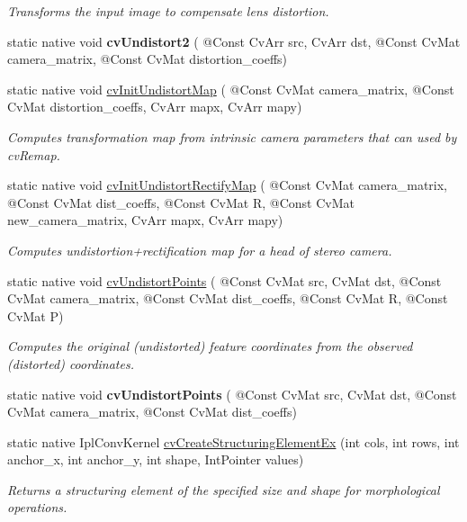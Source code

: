 \begin{DoxyCompactItemize}
\begin{DoxyCompactList}\small\item\em Transforms the input image to compensate lens distortion. \end{DoxyCompactList}\item 
static native void {\bfseries cv\+Undistort2} ( @Const Cv\+Arr src, Cv\+Arr dst, @Const Cv\+Mat camera\+\_\+matrix, @Const Cv\+Mat distortion\+\_\+coeffs)
\item 
static native void \hyperlink{group__imgproc__c_gabf5495653e45cb87934afd107d253eba}{cv\+Init\+Undistort\+Map} ( @Const Cv\+Mat camera\+\_\+matrix, @Const Cv\+Mat distortion\+\_\+coeffs, Cv\+Arr mapx, Cv\+Arr mapy)
\begin{DoxyCompactList}\small\item\em Computes transformation map from intrinsic camera parameters that can used by cv\+Remap. \end{DoxyCompactList}\item 
static native void \hyperlink{group__imgproc__c_gab25847a22028fe0d1088d6572aca641a}{cv\+Init\+Undistort\+Rectify\+Map} ( @Const Cv\+Mat camera\+\_\+matrix, @Const Cv\+Mat dist\+\_\+coeffs, @Const Cv\+Mat R, @Const Cv\+Mat new\+\_\+camera\+\_\+matrix, Cv\+Arr mapx, Cv\+Arr mapy)
\begin{DoxyCompactList}\small\item\em Computes undistortion+rectification map for a head of stereo camera. \end{DoxyCompactList}\item 
static native void \hyperlink{group__imgproc__c_ga21444b957a9e68dffef016a844ff35a1}{cv\+Undistort\+Points} ( @Const Cv\+Mat src, Cv\+Mat dst, @Const Cv\+Mat camera\+\_\+matrix, @Const Cv\+Mat dist\+\_\+coeffs, @Const Cv\+Mat R, @Const Cv\+Mat P)
\begin{DoxyCompactList}\small\item\em Computes the original (undistorted) feature coordinates from the observed (distorted) coordinates. \end{DoxyCompactList}\item 
static native void {\bfseries cv\+Undistort\+Points} ( @Const Cv\+Mat src, Cv\+Mat dst, @Const Cv\+Mat camera\+\_\+matrix, @Const Cv\+Mat dist\+\_\+coeffs)
\item 
static native Ipl\+Conv\+Kernel \hyperlink{group__imgproc__c_ga8a9b8019d4c181721e0f3fbb6c87cb42}{cv\+Create\+Structuring\+Element\+Ex} (int cols, int rows, int anchor\+\_\+x, int anchor\+\_\+y, int shape, Int\+Pointer values)
\begin{DoxyCompactList}\small\item\em Returns a structuring element of the specified size and shape for morphological operations. \end{DoxyCompactList}\item 

\end{DoxyCompactItemize}
